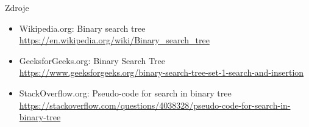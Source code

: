 \documentclass[10pt]{beamer}
\begin{document}
\begin{frame}{Zdroje}
    \begin{itemize}
        \item Wikipedia.org: Binary search tree\\
        \url{https://en.wikipedia.org/wiki/Binary_search_tree} 
        \item GeeksforGeeks.org: Binary Search Tree\\
        \url{https://www.geeksforgeeks.org/binary-search-tree-set-1-search-and-insertion} 
        \item StackOverflow.org: Pseudo-code for search in binary tree\\
        \url{https://stackoverflow.com/questions/4038328/pseudo-code-for-search-in-binary-tree} 
    \end{itemize}
\end{frame}
\end{document}
